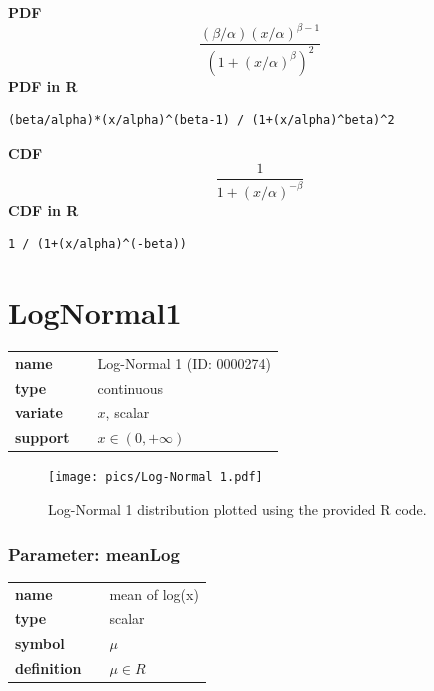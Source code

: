 \documentclass{article}
\begin{document}
\smallskip \noindent \hspace{.2cm} \textbf{PDF} 
\begin{equation*}\frac{(\beta/\alpha)(x/\alpha)^{\beta-1}}{(1+(x/\alpha)^\beta)^2}\end{equation*}
\smallskip \noindent \hspace{.2cm} \textbf{PDF in R}  
\begin{verbatim}(beta/alpha)*(x/alpha)^(beta-1) / (1+(x/alpha)^beta)^2\end{verbatim}
\smallskip \noindent \hspace{.2cm} \textbf{CDF} 
\begin{equation*}\frac{1}{1+(x/\alpha)^{-\beta}}\end{equation*}
\smallskip \noindent \hspace{.2cm} \textbf{CDF in R} 
\begin{verbatim}1 / (1+(x/alpha)^(-beta))\end{verbatim}
\smallskip\section*{LogNormal1} 

  \bigskip 

\begin{tabular}{p{2cm}cl}
\textbf{name} & & Log-Normal 1 (ID: 0000274)\\ 
 
\textbf{type} & & continuous \\ 

\textbf{variate} & & $x$, scalar \\ 

\textbf{support} & & $x \in (0,+\infty)$
\end{tabular}

\begin{figure}[ht!]
\centering
  \texttt{[image: pics/Log-Normal 1.pdf]}
 \caption{Log-Normal 1 distribution plotted using the provided R code.}
 \label{fig:Log-Normal 1}
\end{figure}

\subsubsection*{Parameter: meanLog}

\noindent\begin{tabular}{p{2cm}cl}
\textbf{name} & & mean of log(x) \\
\textbf{type} & & scalar \\
\textbf{symbol} & & $\mu$  \\
\textbf{definition} & & $\mu \in R$
\end{tabular}
\end{document}
